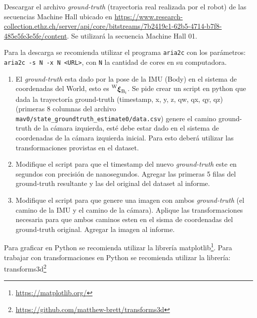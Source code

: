 \documentclass[tp]{lcc}
\begin{document}
Descargar el archivo \emph{ground-truth} (trayectoria real realizada por el robot) de las secuencias Machine Hall ubicado en \url{https://www.research-collection.ethz.ch/server/api/core/bitstreams/7b2419c1-62b5-4714-b7f8-485e5fe3e5fe/content}. Se utilizará la secuencia Machine Hall 01.

\begin{nota}
	Para la descarga se recomienda utilizar el programa \lstinline{aria2c} con los parámetros: \lstinline{aria2c -s N -x N <URL>}, con \lstinline{N} la cantidad de cores en su computadora.
\end{nota}

\begin{enumerate}
    \item El \emph{ground-truth} esta dado por la pose de la IMU (Body) en el sistema de coordenadas del World, esto es $\prescript{\mathrm{\mathrm{W}}}{}{{\boldsymbol{\mathbf{\xi}}}_\mathrm{\mathrm{B}_{i}}}$. Se pide crear un script en python que dada la trayectoría ground-truth (timestamp, x, y, z, qw, qx, qy, qz) (primeras 8 columnas del archivo \lstinline{mav0/state_groundtruth_estimate0/data.csv}) genere el camino ground-truth de la cámara izquierda, esté debe estar dado en el sistema de coordenadas de la cámara izquierda inicial. Para esto deberá utilizar las transformaciones provistas en el dataset.
    
    \item Modifique el script para que el timestamp del nuevo \emph{ground-truth} este en segundos con precisión de nanosegundos. Agregar las primeras 5 filas del ground-truth resultante y las del original del dataset al informe.
    
    \item Modifique el script para que genere una imagen con ambos \emph{ground-truth} (el camino de la IMU y el camino de la cámara). Aplique las transformaciones necesaria para que ambos caminos esten en el sisma de coordenadas del ground-truth original. Agregar la imagen al informe.
\end{enumerate}

\begin{nota}
	Para graficar en Python se recomienda utilizar la librería matplotlib\footnote{\url{https://matplotlib.org/}}. Para trabajar con transformaciones en Python se recomienda utilizar la librería: transforms3d\footnote{\url{https://github.com/matthew-brett/transforms3d}}
\end{nota}
\end{document}
